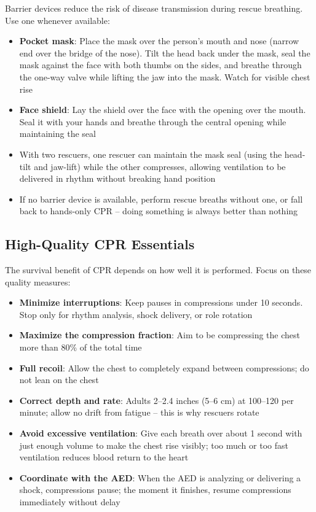 Barrier devices reduce the risk of disease transmission during rescue breathing. Use one whenever available:

\begin{itemize}[leftmargin=*]
  \item \textbf{Pocket mask}: Place the mask over the person's mouth and nose (narrow end over the bridge of the nose). Tilt the head back under the mask, seal the mask against the face with both thumbs on the sides, and breathe through the one-way valve while lifting the jaw into the mask. Watch for visible chest rise
  \item \textbf{Face shield}: Lay the shield over the face with the opening over the mouth. Seal it with your hands and breathe through the central opening while maintaining the seal
  \item With two rescuers, one rescuer can maintain the mask seal (using the head-tilt and jaw-lift) while the other compresses, allowing ventilation to be delivered in rhythm without breaking hand position
  \item If no barrier device is available, perform rescue breaths without one, or fall back to hands-only CPR -- doing something is always better than nothing
\end{itemize}

\subsection{High-Quality CPR Essentials}

The survival benefit of CPR depends on how well it is performed. Focus on these quality measures:

\begin{itemize}[leftmargin=*]
  \item \textbf{Minimize interruptions}: Keep pauses in compressions under 10 seconds. Stop only for rhythm analysis, shock delivery, or role rotation
  \item \textbf{Maximize the compression fraction}: Aim to be compressing the chest more than 80\% of the total time
  \item \textbf{Full recoil}: Allow the chest to completely expand between compressions; do not lean on the chest
  \item \textbf{Correct depth and rate}: Adults 2--2.4 inches (5--6 cm) at 100--120 per minute; allow no drift from fatigue -- this is why rescuers rotate
  \item \textbf{Avoid excessive ventilation}: Give each breath over about 1 second with just enough volume to make the chest rise visibly; too much or too fast ventilation reduces blood return to the heart
  \item \textbf{Coordinate with the AED}: When the AED is analyzing or delivering a shock, compressions pause; the moment it finishes, resume compressions immediately without delay
\end{itemize}

